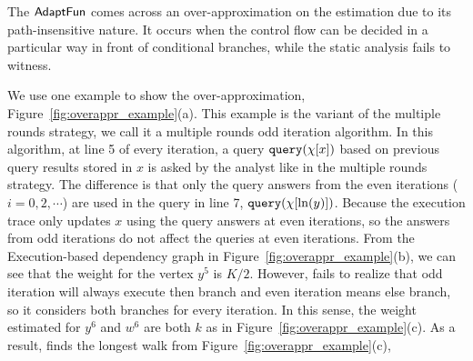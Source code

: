 \begin{example}
The $\textsf{AdaptFun}$ comes across an over-approximation on the estimation due to its path-insensitive nature. 
It occurs when the control flow can be decided in a particular way in front of conditional branches, while the static analysis fails to witness. 

We use one example to show the over-approximation, Figure~\ref{fig:overappr_example}(a). This example is the variant of the multiple rounds strategy, 
we call it a multiple rounds odd iteration algorithm. In this algorithm, at line 5 of every iteration, 
a query ${\tt query}(\chi[x])$ based on previous query results stored in $x$ is asked by the analyst like in the multiple rounds strategy. The difference is that only the query answers from the even iterations ($i =0, 2, \cdots $) are 
used in the query 
in line 7, ${\tt query}(\chi[\ln(y)])$.
  Because the execution trace only updates 
$x$ using the query answers at even iterations, so the answers from odd iterations do not affect the queries at even iterations. 
From the Execution-based dependency graph in Figure~\ref{fig:overappr_example}(b), 
we can see that the weight for the vertex $y^5$ is 
$K/2$. 
However, {\THESYSTEM} fails to realize that odd iteration will always execute then branch and even iteration means else branch, so 
it considers both branches for every iteration. 
In this sense, the weight estimated for $y^6$ and $w^6$ are both 
$k$ as in Figure~\ref{fig:overappr_example}(c).
As a result, {\THESYSTEM}  finds the longest walk from Figure~\ref{fig:overappr_example}(c),

\end{example}
